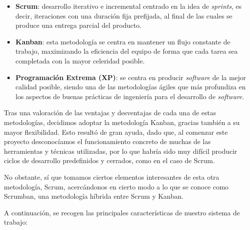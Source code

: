 \begin{itemize}
	\item [\textbullet] \textbf{Scrum}: desarrollo iterativo e incremental centrado en la idea de \emph{sprints}, es decir, iteraciones con una duración fija prefijada, al final de las cuales se produce una entrega parcial del producto.
	\item [\textbullet] \textbf{Kanban}: esta metodología se centra en mantener un flujo constante de trabajo, maximizando la eficiencia del equipo de forma que cada tarea sea completada con la mayor celeridad posible.
	\item [\textbullet] \textbf{Programación Extrema (XP)}: se centra en producir \emph{software} de la mejor calidad posible, siendo una de las metodologías ágiles que más profundiza en los aspectos de buenas prácticas de ingeniería para el desarrollo de \emph{software}.
\end{itemize}

Tras una valoración de las ventajas y desventajas de cada una de estas metodologías, decidimos adoptar la metodología Kanban, gracias también a su mayor flexibilidad. Esto resultó de gran ayuda, dado que, al comenzar este proyecto desconocíamos el funcionamiento concreto de muchas de las herramientas y técnicas utilizadas, por lo que habría sido muy difícil producir ciclos de desarrollo predefinidos y cerrados, como en el caso de Scrum.

No obstante, sí que tomamos ciertos elementos interesantes de esta otra metodología, Scrum, acercándonos en cierto modo a lo que se conoce como Scrumban, una metodología híbrida entre Scrum y Kanban.

A continuación, se recogen las principales características de nuestro sistema de trabajo:

\vspace{-0.5cm}

